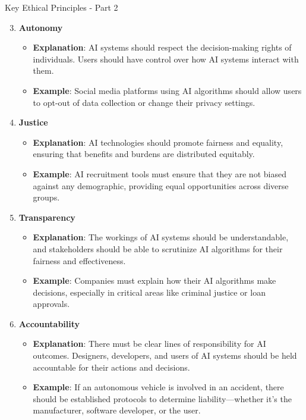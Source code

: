 \documentclass[aspectratio=169]{beamer}
\begin{document}
\begin{frame}[fragile]{Key Ethical Principles - Part 2}
    \begin{enumerate}
        \setcounter{enumi}{2} %
        \item \textbf{Autonomy}
        \begin{itemize}
            \item \textbf{Explanation}: AI systems should respect the decision-making rights of individuals. Users should have control over how AI systems interact with them.
            \item \textbf{Example}: Social media platforms using AI algorithms should allow users to opt-out of data collection or change their privacy settings.
        \end{itemize}

        \item \textbf{Justice}
        \begin{itemize}
            \item \textbf{Explanation}: AI technologies should promote fairness and equality, ensuring that benefits and burdens are distributed equitably.
            \item \textbf{Example}: AI recruitment tools must ensure that they are not biased against any demographic, providing equal opportunities across diverse groups.
        \end{itemize}
        
        \item \textbf{Transparency}
        \begin{itemize}
            \item \textbf{Explanation}: The workings of AI systems should be understandable, and stakeholders should be able to scrutinize AI algorithms for their fairness and effectiveness.
            \item \textbf{Example}: Companies must explain how their AI algorithms make decisions, especially in critical areas like criminal justice or loan approvals.
        \end{itemize}
        
        \item \textbf{Accountability}
        \begin{itemize}
            \item \textbf{Explanation}: There must be clear lines of responsibility for AI outcomes. Designers, developers, and users of AI systems should be held accountable for their actions and decisions.
            \item \textbf{Example}: If an autonomous vehicle is involved in an accident, there should be established protocols to determine liability—whether it’s the manufacturer, software developer, or the user.
        \end{itemize}
    \end{enumerate}
\end{frame}
\end{document}

